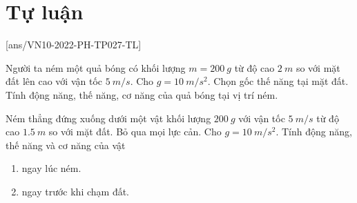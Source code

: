 \section{Tự luận}
\setcounter{ex}{0}
[ans/VN10-2022-PH-TP027-TL]
\begin{ex}
	Người ta ném một quả bóng có khối lượng $m=\SI{200}{g}$ từ độ cao $\SI{2}{m}$ so với mặt đất lên cao với vận tốc $\SI{5}{m/s}$. Cho $g=\SI{10}{m/s^2}$. Chọn gốc thế năng tại mặt đất. Tính động năng, thế năng, cơ năng của quả bóng tại vị trí ném.
\end{ex}
\begin{ex}
	Ném thẳng đứng xuống dưới một vật khối lượng $\SI{200}{g}$ với vận tốc $\SI{5}{m/s}$ từ độ cao $\SI{1.5}{m}$ so với mặt đất. Bỏ qua mọi lực cản. Cho $g=\SI{10}{m/s^2}$. Tính động năng, thế năng và cơ năng của vật
	\begin{enumerate}[label=\alph*)]
		\item ngay lúc ném.
		\item ngay trước khi chạm đất.
	\end{enumerate}
\end{ex}
